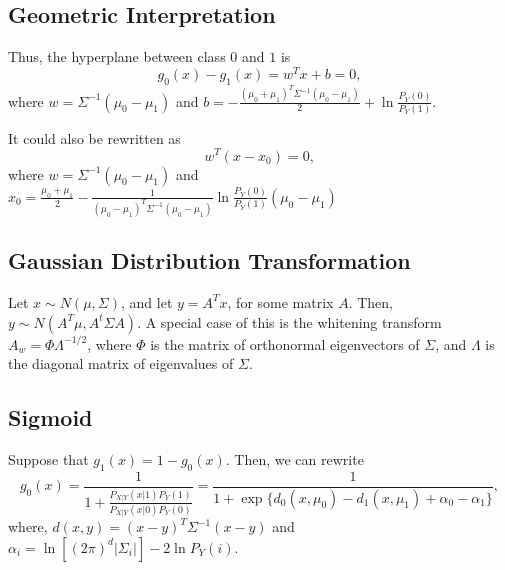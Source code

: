 \documentclass{article}
\newenvironment{topic}[1]{\subsection*{#1}}{}
\begin{document}
\begin{topic}{Geometric Interpretation}
    Thus, the hyperplane between class $0$ and $1$ is 
    \[
        g_0(x) - g_1(x) = w^Tx + b = 0,
    \]
    where $w = \Sigma^{-1}(\mu_0 - \mu_1)$ and $b = -\frac{(\mu_0 + \mu_1)^T\Sigma^{-1}(\mu_0 - \mu_1)}{2} + \ln \frac{P_Y(0)}{P_Y(1)}$.

    It could also be rewritten as
    \[
        w^T(x - x_0) = 0,
    \]
    where $w = \Sigma^{-1}(\mu_0 - \mu_1)$ and $x_0 = \frac{\mu_0 + \mu_1}{2} - \frac{1}{(\mu_0 - \mu_1)^T\Sigma^{-1}(\mu_0 - \mu_1)} \ln \frac{P_Y(0)}{P_Y(1)}(\mu_0 - \mu_1)$
\end{topic}

\begin{topic}{Gaussian Distribution Transformation}
    Let $x \sim N(\mu, \Sigma)$, and let $y = A^Tx$, for some matrix $A$. Then, $y \sim N(A^T\mu, A^t\Sigma A)$. A special case of this is the whitening transform $A_w = \Phi\Lambda^{-1/2}$, where $\Phi$ is the matrix of orthonormal eigenvectors of $\Sigma$, and $\Lambda$ is the diagonal matrix of eigenvalues of $\Sigma$.
\end{topic}

\begin{topic}{Sigmoid}
    Suppose that $g_1(x) = 1 - g_0(x)$. Then, we can rewrite
    \[
        g_0(x) = \frac{1}{1 + \frac{P_{X|Y}(x|1)P_Y(1)}{P_{X|Y}(x|0)P_Y(0)}} = \frac{1}{1 + \exp\{d_0(x, \mu_0) - d_1(x, \mu_1) + \alpha_0 - \alpha_1\}},
    \]
    where, $d(x, y) = (x - y)^T\Sigma^{-1}(x - y)$ and $\alpha_i = \ln \left[(2\pi)^d|\Sigma_i|\right] - 2\ln P_Y(i)$.
\end{topic}
\end{document}
